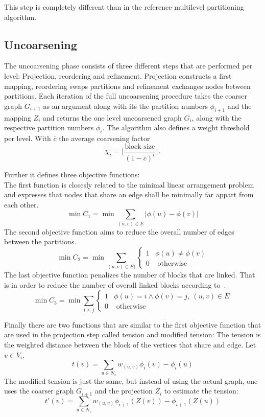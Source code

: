     This step is completely different than in the reference multilevel partitioning algorithm.

    
    \subsection*{Uncoarsening}
    The uncoarsening phase consists of three different steps that are performed per level:
    Projection, reordering and refinement.
    Projection constructs a first mapping, reordering swaps partitions and refinement exchanges nodes between partitions.
    Each iteration of the full uncoarsening procedure takes the coarser graph $G_{i+1}$ as an argument along with its the partition numbers $\phi_{i+1}$ and the mapping $Z_{i}$ and returns the one level uncoarsened graph $G_i$, along with the respective partition numbers $\phi_i$.
    The algorithm also defines a weight threshold per level. With $\overline{c}$ the average coarsening factor
    \[ \chi_i = \lfloor \frac{\text{block size}}{(1-\overline{c})^i} \rfloor. \]
    
    Further it defines three objective functions:\\
    The first function is closesly related to the minimal linear arrangement problem~\autocite{lewis1983computers} and expresses that nodes that share an edge shall be minimally far appart from each other.
    \[ \min C_1 = \min \sum_{(u,v) \in E} |\phi(u) - \phi(v)| \]
    The second objective function aims to reduce the overall number of edges between the partitions.
    \[\min C_2 = \min \sum_{(u,v) \in E)} \begin{cases}
        1 & \phi(u) \neq \phi(v) \\
        0 & \text{ otherwise}
    \end{cases}
\]
    The last objective function penalizes the number of blocks that are linked. That is in order to reduce the number of overall linked blocks according to~\autocite{steinhaus2010g}.
    \[ \min C_3 = \min \sum_{i \leq j} 
    \begin{cases}
        1 & \phi(u) = i \wedge \phi(v) = j, \ (u,v) \in E \\
        0 & \text{ otherwise}
    \end{cases}
    \]
    
    Finally there are two functions that are similar to the first objective function that are used in the projection step called tension and modified tension:
    The tension is the weighted distance between the block of the vertices that share and edge. Let $v \in V_i$.
    \[ t(v) = \sum_{u \in N_v} w_{(u,v)} \phi_i(v) - \phi_i(u)\]
     The modified tension is just the same, but instead of using the actual graph, one uses the coarser graph $G_{i+1}$ and the projection $Z_{i}$ to estimate the tension:
     \[ t'(v) = \sum_{u \in N_v} w_{(u, v)} \phi_{i+1}(Z(v)) - \phi_{i+1}(Z(u)) \]
    
